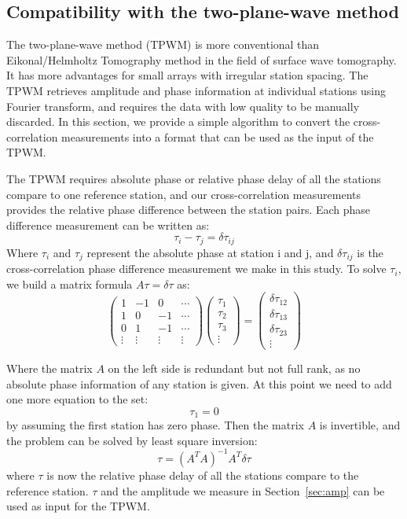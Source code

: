 \documentclass[referee]{gji}
\begin{document}
\subsection{Compatibility with the two-plane-wave method}
The two-plane-wave method (TPWM) \cite{Forsyth:2005aa} is more conventional than Eikonal/Helmholtz Tomography method \cite{Lin:2009fx,Lin:2011fw} in the field of surface wave tomography. It has more advantages for small arrays with irregular station spacing.  The TPWM retrieves amplitude and phase information at individual stations using Fourier transform, and requires the data with low quality to be manually discarded.  In this section, we provide a simple algorithm to convert the cross-correlation measurements into a format that can be used as the input of the TPWM.

The TPWM requires absolute phase or relative phase delay of all the stations compare to one reference station, and our cross-correlation measurements provides the relative phase difference between the station pairs. Each phase difference measurement can be written as:
\[
\tau_i - \tau_j = \delta \tau_{ij}
\]
Where $\tau_i$ and $\tau_j$ represent the absolute phase at station i and j, and $\delta \tau_{ij}$ is the cross-correlation phase difference measurement we make in this study. To solve $\tau_i$, we build a matrix formula $A\tau = \delta\tau$ as:
\[ 
\left( \begin{array}{cccc}
1 & -1 & 0 & \cdots \\
1 & 0 & -1 & \cdots \\
0 & 1 & -1 & \cdots \\
\vdots &\vdots &\vdots & \vdots
\end{array} \right)
\left( \begin{array}{c}
	\tau_1 \\ 
	\tau_2 \\
	\tau_3 \\
	\vdots
\end{array} \right) = 
\left( \begin{array}{c}
	\delta \tau_{12} \\ 
	\delta \tau_{13} \\
	\delta \tau_{23} \\
	\vdots
\end{array} \right)  
\] 

Where the matrix $A$ on the left side is redundant but not full rank, as no absolute phase information of any station is given. At this point we need to add one more equation to the set:
\[
\tau_1 = 0
\]
by assuming the first station has zero phase. Then the matrix $A$ is invertible, and the problem can be solved by least square inversion:
\[
\tau = (A^TA)^{-1}A^T \delta\tau
\]
where $\tau$ is now the relative phase delay of all the stations compare to the reference station. $\tau$ and the amplitude we measure in Section~\ref{sec:amp} can be used as input for the TPWM.
\end{document}
